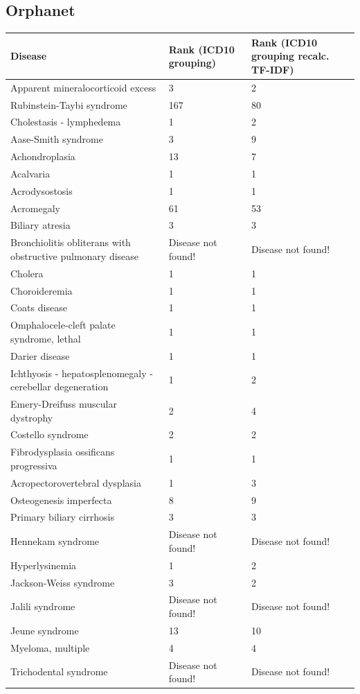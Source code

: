 \documentclass[10pt,letterpaper,final]{article}
\begin{document}
\subsection{Orphanet}
\begin{center}
\begin{small}
	\begin{longtable}{|p{3.5cm}|p{1.8cm}|p{1.8cm}|}
	\hline
	\textbf{Disease}  & \textbf{Rank (ICD10 grouping)} & \textbf{Rank (ICD10 grouping recalc. TF-IDF)} \\
	\hline\hline
Apparent mineralocorticoid excess & 3 & 2\\    \hline
Rubinstein-Taybi syndrome & 167 & 80\\    \hline
Cholestasis - lymphedema & 1 & 2\\    \hline
Aase-Smith syndrome & 3 & 9\\    \hline
Achondroplasia & 13 & 7\\    \hline
Acalvaria & 1 & 1\\    \hline
Acrodysostosis & 1 & 1\\    \hline
Acromegaly & 61 & 53\\    \hline
Biliary atresia & 3 & 3\\    \hline
Bronchiolitis obliterans with obstructive pulmonary disease & Disease not found!  & Disease not found!\\    \hline
Cholera & 1 & 1\\    \hline
Choroideremia & 1 & 1\\    \hline
Coats disease & 1 & 1\\    \hline
Omphalocele-cleft palate syndrome, lethal & 1 & 1\\    \hline
Darier disease & 1 & 1\\    \hline
Ichthyosis - hepatosplenomegaly - cerebellar degeneration & 1 & 2\\    \hline
Emery-Dreifuss muscular dystrophy & 2 & 4\\    \hline
Costello syndrome & 2 & 2\\    \hline
Fibrodysplasia ossificans progressiva & 1 & 1\\    \hline
Acropectorovertebral dysplasia & 1 & 3\\    \hline
Osteogenesis imperfecta & 8 & 9\\    \hline
Primary biliary cirrhosis & 3 & 3\\    \hline
Hennekam syndrome & Disease not found!  & Disease not found!\\    \hline
Hyperlysinemia & 1 & 2\\    \hline
Jackson-Weiss syndrome & 3 & 2\\    \hline
Jalili syndrome & Disease not found!  & Disease not found!\\    \hline
Jeune syndrome & 13 & 10\\    \hline
Myeloma, multiple & 4 & 4\\    \hline
Trichodental syndrome & Disease not found!  & Disease not found!\\    \hline
	\end{longtable}
\end{small}
\end{center}
\end{document}
